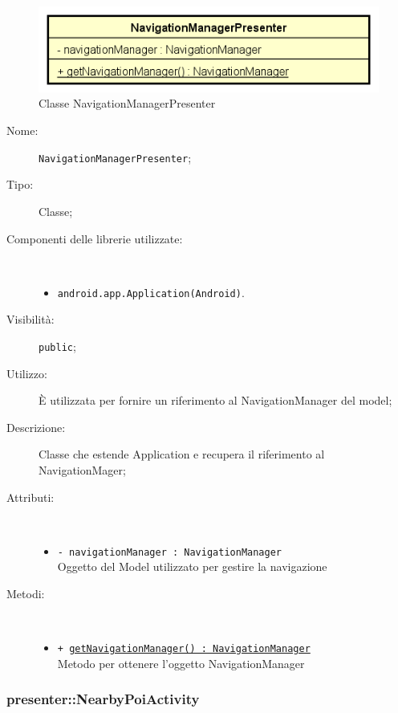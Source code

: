 \documentclass[../DefinizioneDiProdotto.tex]{subfiles}
\begin{document}
    \begin{figure}[H]
        \centering
        \includegraphics{img/NavigationManagerPresenter.png}
        \caption{Classe NavigationManagerPresenter}\label{fig:presenter::NavigationManagerPresenter} 
    \end{figure}
    \begin{description}
\item[Nome:] \texttt{NavigationManagerPresenter};
\item[Tipo:] Classe;
\item[Componenti delle librerie utilizzate:] \
\begin{itemize}
\item \texttt{android.app.Application(Android)}.

\end{itemize}
\item[Visibilità:] \texttt{public};
\item[Utilizzo:] È utilizzata per fornire un riferimento al NavigationManager del model;
\item[Descrizione:] Classe che estende Application e recupera il riferimento al NavigationMager;
\item[Attributi:] \
\begin{itemize}
\item \texttt{- navigationManager : NavigationManager}\\
Oggetto del Model utilizzato per gestire la navigazione

\end{itemize}
\item[Metodi:] \
\begin{itemize}
\item \texttt{+ \underline{getNavigationManager() : NavigationManager}}\\
Metodo per ottenere l'oggetto NavigationManager
 \end{itemize}
\end{description}

\subsubsection{presenter::NearbyPoiActivity}
\end{document}
